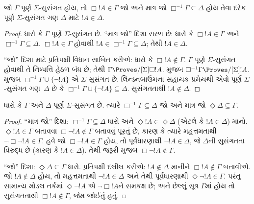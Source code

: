 %



\begin{prop}
  જો $\Gamma$ પૂર્ણ $\Sigma$-સુસંગત હોય, તો $\Box !A \in
  \Gamma$ જો અને માત્ર જો $\Box^{-1} \Gamma \subseteq \Delta$
  હોય તેવા દરેક પૂર્ણ $\Sigma$-સુસંગત ગણ $\Delta$ માટે
  $!A \in \Delta$.
\end{prop}

\begin{proof}
  ધારો કે $\Gamma$ પૂર્ણ $\Sigma$-સુસંગત છે. ``માત્ર જો'' દિશા
  સરળ છે: ધારો કે $\Box !A \in \Gamma$ અને $\Box^{-1}\Gamma
  \subseteq \Delta$. $\Box!A \in \Gamma$ હોવાથી
  $!A \in \Box^{-1}\Gamma \subseteq \Delta$; તેથી
  $!A \in \Delta$.

  ``જો'' દિશા માટે પ્રતિપક્ષી વિધાન સાબિત કરીએ: ધારો કે
  $\Box!A \notin \Gamma$. $\Gamma$ પૂર્ણ $\Sigma$-સુસંગત હોવાથી
  તે નિષ્પત્તિ હેઠળ બંધ છે; તેથી $\Gamma \Proves/[\Sigma] \Box !A$.
   મુજબ $\Box^{-1}\Gamma \Proves/[\Sigma] !A$.
  મુજબ $\Box^{-1}\Gamma \cup \{ \lnot!A \}$ એ
  $\Sigma$-સુસંગત છે. લિન્ડનબાઉમના સહાયક પ્રમેયથી એવો પૂર્ણ
  $\Sigma$-સુસંગત ગણ~$\Delta$ છે કે $\Box^{-1}\Gamma \cup
  \{ \lnot!A \} \subseteq \Delta$. સુસંગતતાથી $!A \notin \Delta$.
\end{proof}


\begin{lem}
  ધારો કે $\Gamma$ અને $\Delta$ પૂર્ણ $\Sigma$-સુસંગત છે.
  ત્યારે $\Box^{-1}\Gamma \subseteq \Delta$ જો અને માત્ર જો
  $\Diamond\Delta \subseteq \Gamma$.
\end{lem}

\begin{proof}
  ``માત્ર જો'' દિશા: $\Box^{-1}\Gamma \subseteq \Delta$ ધારો અને
  $\Diamond!A \in \Diamond\Delta$ (એટલે કે $!A \in \Delta$)
  માનો. $\Diamond!A \in \Gamma$ બતાવવા $\Box\lnot!A \notin
  \Gamma$ બતાવવું પૂરતું છે, કારણ કે ત્યારે મહત્તમતાથી
  $\lnot\Box\lnot !A \in \Gamma$. હવે જો $\Box\lnot!A \in
  \Gamma$ હોય, તો પૂર્વધારણાથી $\lnot!A \in \Delta$, જે
  $\Delta$ની સુસંગતતા વિરુદ્ધ છે (કારણ કે $!A \in \Delta$).
  તેથી જરૂરી મુજબ $\Box\lnot!A \notin \Gamma$.

  ``જો'' દિશા: $\Diamond\Delta \subseteq \Gamma$ ધારો.
  પ્રતિપક્ષી દલીલ કરીએ: $!A \notin \Delta$ માનીને
  $\Box!A \notin \Gamma$ બતાવીએ. જો $!A \notin \Delta$ હોય,
  તો મહત્તમતાથી $\lnot!A \in \Delta$ અને તેથી પૂર્વધારણાથી
  $\Diamond\lnot!A \in \Gamma$. પરંતુ સામાન્ય મોડલ તર્કમાં
  $\Diamond\lnot!A$ એ $\lnot\Box !A$ને સમકક્ષ છે; અને છેલ્લું
  સૂત્ર $\Gamma$માં હોય તો સુસંગતતાથી $\Box!A \notin\Gamma$,
  જેમ જોઈતું હતું.
\end{proof}

